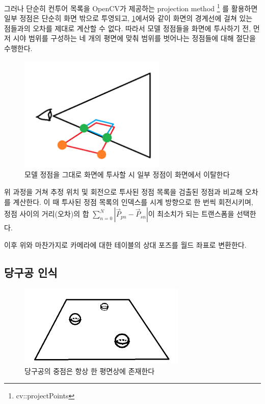 \documentclass[11pt]{oblivoir}
\begin{document}
    그러나 단순히 컨투어 목록을 OpenCV가 제공하는 projection method
    \footnote{cv::projectPoints}
    를 활용하면 일부 정점은 단순히 화면 밖으로 투영되고, \cref{fig;invalid-sight-projection}에서와 같이 화면의 경계선에 걸쳐 있는 점들과의 오차를 제대로 계산할 수 없다. 따라서 모델 정점들을 화면에 투사하기 전, 먼저 시야 범위를 구성하는 네 개의 평면에 맞춰 범위를 벗어나는 정점들에 대해 절단을 수행한다.

    \begin{figure}[h]
        \centering
        \includegraphics[width=7cm]{img/sight-invalid-culling.png}
        \caption{모델 정점을 그대로 화면에 투사할 시 일부 정점이 화면에서 이탈한다}
        \label{fig;invalid-sight-projection}
    \end{figure}

    위 과정을 거쳐 추정 위치 및 회전으로 투사된 정점 목록을 검출된 정점과 비교해 오차를 계산한다. 이 때  투사된 정점 목록의 인덱스를 시계 방향으로 한 번씩 회전시키며, 정점 사이의 거리(오차)의 합 $\sum_{n=0}^{N}|\vec{P}_{pn} - \vec{P}_{sn}|$이 최소치가 되는 트랜스폼을 선택한다.

    이후 위와 마찬가지로 카메라에 대한 테이블의 상대 포즈를 월드 좌표로 변환한다.



\subsection{당구공 인식}

    \begin{figure}[ht]
        \centering
        \includegraphics[width=8cm]{img/ball-recognition-introduce.png}
        \caption{당구공의 중점은 항상 한 평면상에 존재한다}
        \label{fig;ball-recognition-intro}
    \end{figure}
\end{document}
